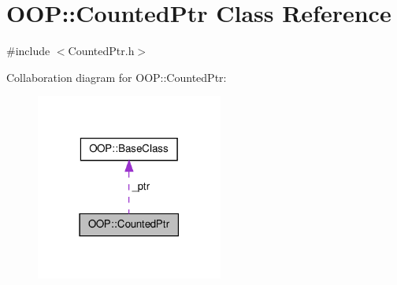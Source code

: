 \hypertarget{classOOP_1_1CountedPtr}{\section{\-O\-O\-P\-:\-:\-Counted\-Ptr \-Class \-Reference}
\label{classOOP_1_1CountedPtr}
}


{\ttfamily \#include $<$\-Counted\-Ptr.\-h$>$}



\-Collaboration diagram for \-O\-O\-P\-:\-:\-Counted\-Ptr\-:
\nopagebreak
\begin{figure}[H]
\begin{center}
\leavevmode
\includegraphics[width=174pt]{classOOP_1_1CountedPtr__coll__graph}
\end{center}
\end{figure}
